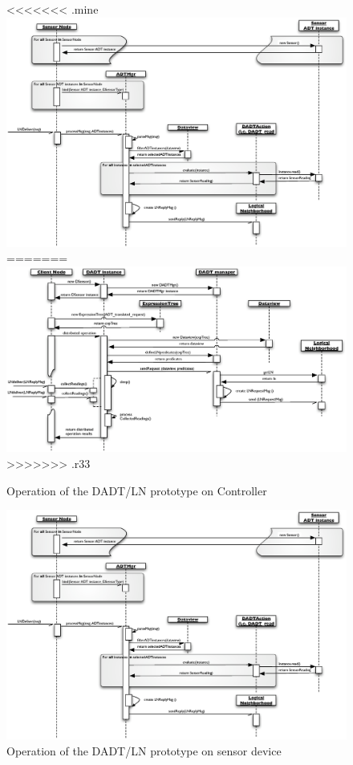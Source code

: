 \begin{figure}[p]
\centering
<<<<<<< .mine
\label{Fig:SeqDiagram_Sensornode}
\includegraphics[scale=0.65, angle=90]{img/SeqDiagram_Sensornode.eps} 
=======
\label{Fig:SeqDiagram_PCnode}
\includegraphics[scale=0.65, angle=90]{img/SeqDiagram_PCnode.eps} 
>>>>>>> .r33
\caption[Operation
of the DADT/LN prototype on Controller]{Operation
of the DADT/LN prototype on Controller}
\end{figure} 


\begin{figure}[p]
\centering
\label{Fig:SeqDiagram_Sensornode}
\includegraphics[scale=0.65, angle=90]{img/SeqDiagram_Sensornode.eps} 
\caption[Operation
of the DADT/LN prototype on sensor device,angle=90]{Operation
of the DADT/LN prototype on sensor device}
\end{figure} 

